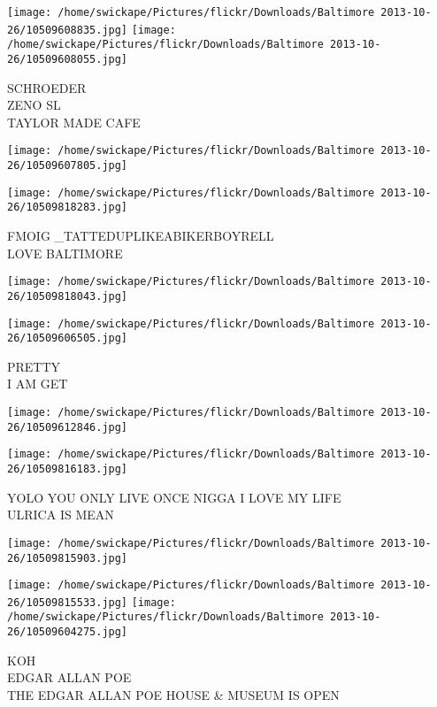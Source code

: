 \documentclass[10pt,letterpaper]{article}
\begin{document}
\vspace{0.25in}
\texttt{[image: /home/swickape/Pictures/flickr/Downloads/Baltimore 2013-10-26/10509608835.jpg]}
\texttt{[image: /home/swickape/Pictures/flickr/Downloads/Baltimore 2013-10-26/10509608055.jpg]}

SCHROEDER\\
ZENO SL\\
TAYLOR MADE CAFE
\pagebreak

\texttt{[image: /home/swickape/Pictures/flickr/Downloads/Baltimore 2013-10-26/10509607805.jpg]}

\vspace{0.25in}
\texttt{[image: /home/swickape/Pictures/flickr/Downloads/Baltimore 2013-10-26/10509818283.jpg]}

FMOIG \_TATTEDUPLIKEABIKERBOYRELL\\
LOVE BALTIMORE
\pagebreak

\texttt{[image: /home/swickape/Pictures/flickr/Downloads/Baltimore 2013-10-26/10509818043.jpg]}

\vspace{0.25in}
\texttt{[image: /home/swickape/Pictures/flickr/Downloads/Baltimore 2013-10-26/10509606505.jpg]}

PRETTY\\
I AM GET
\pagebreak

\texttt{[image: /home/swickape/Pictures/flickr/Downloads/Baltimore 2013-10-26/10509612846.jpg]}

\vspace{0.25in}
\texttt{[image: /home/swickape/Pictures/flickr/Downloads/Baltimore 2013-10-26/10509816183.jpg]}

YOLO YOU ONLY LIVE ONCE NIGGA I LOVE MY LIFE\\
ULRICA IS MEAN
\pagebreak

\texttt{[image: /home/swickape/Pictures/flickr/Downloads/Baltimore 2013-10-26/10509815903.jpg]}

\vspace{0.25in}
\texttt{[image: /home/swickape/Pictures/flickr/Downloads/Baltimore 2013-10-26/10509815533.jpg]}
\texttt{[image: /home/swickape/Pictures/flickr/Downloads/Baltimore 2013-10-26/10509604275.jpg]}

KOH\\
EDGAR ALLAN POE\\
THE EDGAR ALLAN POE HOUSE \& MUSEUM IS OPEN
\pagebreak
\end{document}
